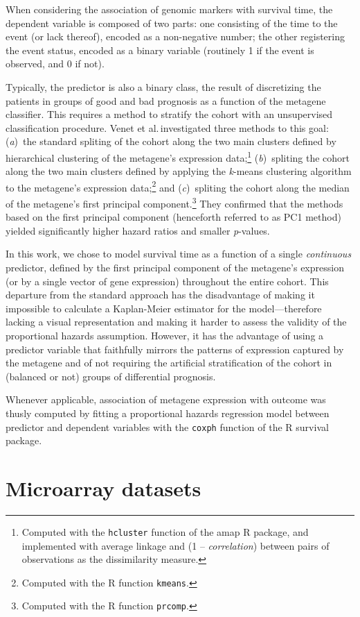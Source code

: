 When considering the association of genomic markers with survival time, the
dependent variable is composed of two parts: one consisting of the time to the
event (or lack thereof), encoded as a non-negative number; the other registering
the event status, encoded as a binary variable (routinely 1 if the event is
observed, and 0 if not).

Typically, the predictor is also a binary class, the result of discretizing the
patients in groups of good and bad prognosis as a function of the metagene
classifier.  This requires a method to stratify the cohort with an unsupervised
classification procedure.  Venet et al.\cite{venet_most_2011}\,investigated
three methods to this goal: (\emph{a})~the standard spliting of the cohort along
the two main clusters defined by hierarchical clustering of the metagene's
expression data;\footnote{Computed with the \texttt{hcluster} function of the
  \textsf{amap} \textsf{R} package, and implemented with average linkage and (1
  -- \emph{correlation}) between pairs of observations as the dissimilarity
  measure.} (\emph{b})~spliting the cohort along the two main clusters defined
by applying the \emph{k}-means clustering algorithm to the metagene's expression
data;\footnote{Computed with the \textsf{R} function \texttt{kmeans}.} and
(\emph{c})~spliting the cohort along the median of the metagene's first
principal component.\footnote{Computed with the \textsf{R} function
  \texttt{prcomp}.} They confirmed that the methods based on the first principal
component (henceforth referred to as \textsf{PC1} method) yielded significantly
higher hazard ratios and smaller \emph{p}-values.

In this work, we chose to model survival time as a function of a single
\emph{continuous} predictor, defined by the first principal component of the
metagene's expression (or by a single vector of gene expression) throughout the
entire cohort.  This departure from the standard approach has the disadvantage
of making it impossible to calculate a Kaplan-Meier estimator for the
model---therefore lacking a visual representation and making it harder to assess
the validity of the proportional hazards assumption.  However, it has the
advantage of using a predictor variable that faithfully mirrors the patterns of
expression captured by the metagene and of not requiring the artificial
stratification of the cohort in (balanced or not) groups of differential
prognosis.

Whenever applicable, association of metagene expression with outcome was thusly
computed by fitting a proportional hazards regression model between predictor
and dependent variables with the \texttt{coxph} function of the \textsf{R}
\textsf{survival} package.


\section{Microarray datasets}
\label{sec:methods-datasets}
